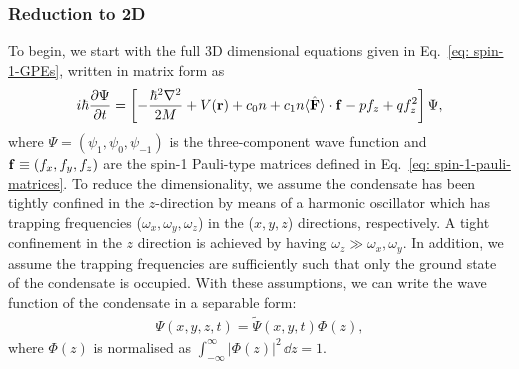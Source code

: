 \subsubsection{Reduction to 2D}
To begin, we start with the full 3D dimensional equations given in
Eq.~\eqref{eq: spin-1-GPEs}, written in matrix form as
\begin{align}\label{eq: spin-1-GPEs-matrix}
    i\hbar \pdv{\Psi}{t} = \left[-\frac{\hbar^2\nabla^2}{2M} + V(\vb{r}) + c_0n
    + c_1n \langle\hat{\vb{F}}\rangle \cdot \vb{f}
    - pf_z
    + qf_z^2\right]\Psi,
\end{align}
where \(\Psi=(\psi_1, \psi_0, \psi_{-1})\) is the three-component wave function
and \(\vb{f}\equiv(f_x, f_y, f_z)\) are the spin-1 Pauli-type matrices defined
in Eq.~\eqref{eq: spin-1-pauli-matrices}.
To reduce the dimensionality, we assume the condensate has been tightly confined
in the \(z\)-direction by means of a harmonic oscillator which has trapping
frequencies (\(\omega_x, \omega_y, \omega_z\)) in the (\(x, y, z\)) directions,
respectively.
A tight confinement in the \(z\) direction is achieved by having
\(\omega_z \gg \omega_x, \omega_y\).
In addition, we assume the trapping frequencies are sufficiently such that only
the ground state of the condensate is occupied.
With these assumptions, we can write the wave function of the condensate in a
separable form:
\begin{align}\label{eq: Psi-2D}
    \Psi(x, y, z, t) = \tilde{\Psi}(x, y, t)\Phi(z),
\end{align}
where \(\Phi(z)\) is normalised as \(\int_{-\infty}^{\infty}|\Phi(z)|^2 \, \dd z
= 1\).

